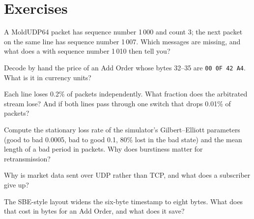 \section{Exercises}

\begin{exercise}[$\star$]\label{exo:ll:protocols-ii-binary-exchange-protocols:1}
A MoldUDP64 packet has sequence number 1\,000 and count 3; the next packet on the same line has sequence number 1\,007. Which
messages are missing, and what does a  with sequence number 1\,010 then tell you?
\end{exercise}

\begin{exercise}[$\star$]\label{exo:ll:protocols-ii-binary-exchange-protocols:2}
Decode by hand the price of an Add Order whose bytes 32--35 are \texttt{00 0F 42 A4}. What is it in currency units?
\end{exercise}

\begin{exercise}[$\star$]\label{exo:ll:protocols-ii-binary-exchange-protocols:3}
Each line loses 0.2\% of packets independently. What fraction does the arbitrated stream lose? And if both lines pass through
one switch that drops 0.01\% of packets?
\end{exercise}

\begin{exercise}[$\star\star$]\label{exo:ll:protocols-ii-binary-exchange-protocols:4}
Compute the stationary loss rate of the simulator's Gilbert--Elliott parameters (good to bad 0.0005, bad to good 0.1, 80\%
lost in the bad state) and the mean length of a bad period in packets. Why does burstiness matter for retransmission?
\end{exercise}

\begin{exercise}[$\star\star$]\label{exo:ll:protocols-ii-binary-exchange-protocols:5}
Why is market data sent over UDP  rather than TCP, and what does a subscriber give up?
\end{exercise}

\begin{exercise}[$\star\star$]\label{exo:ll:protocols-ii-binary-exchange-protocols:6}
The SBE-style layout widens the six-byte timestamp to eight bytes. What does that cost in bytes for an Add Order, and what does
it save?
\end{exercise}

